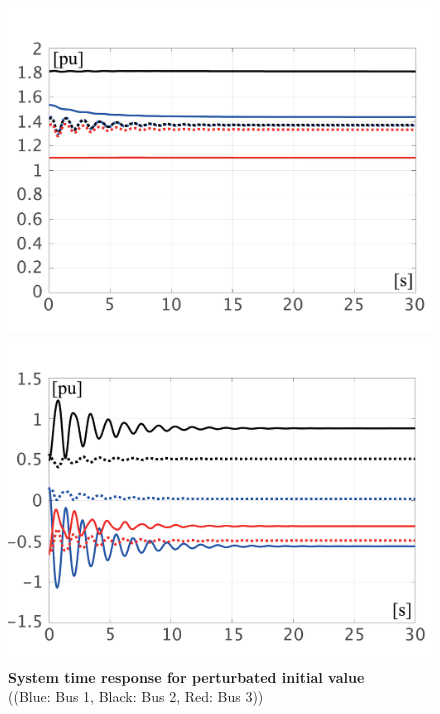 \documentclass[graybox, envcountchap]{svmult}
\begin{document}
\begin{figure}[t]
{\begin{minipage}{0.49\linewidth}
    \includegraphics[width = 1.0\linewidth]{figs/EabsV0}
    \medskip
  \end{minipage}
  \begin{minipage}{0.49\linewidth}
    \centering
    \includegraphics[width = 1.0\linewidth]{figs/PQ0}
    \medskip
  \end{minipage}
  }
  \medskip
  \caption{\textbf{System time response for perturbated initial value}
  \\  \centering((Blue: Bus 1, Black: Bus 2, Red: Bus 3))}
  \label{fig:Kron0}
\medskip
\end{figure}
\end{document}
